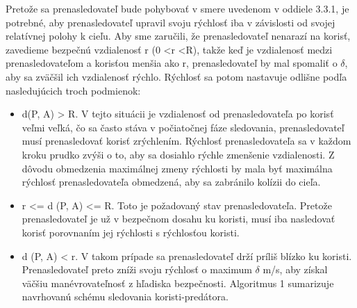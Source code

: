 \vspace{3mm}

\justifying
\noindent
Pretože sa prenasledovateľ bude pohybovať v smere uvedenom v oddiele 3.3.1, je potrebné, aby prenasledovateľ upravil
svoju rýchlosť iba v závislosti od svojej relatívnej polohy k cieľu. Aby sme zaručili, že prenasledovateľ nenarazí na
korisť, zavedieme bezpečnú vzdialenosť r (0 <r <R), takže keď je vzdialenosť medzi prenasledovateľom a korisťou menšia
ako r, prenasledovateľ by mal spomaliť o $\delta$, aby sa zväčšil ich vzdialenosť rýchlo. Rýchlosť sa potom nastavuje
odlišne podľa nasledujúcich troch podmienok: 
\begin{itemize}
    \item d(P, A) > R. V tejto situácii je vzdialenosť od prenasledovateľa po
    korisť veľmi veľká, čo sa často stáva v počiatočnej fáze sledovania, prenasledovateľ musí prenasledovať korisť
    zrýchlením. Rýchlosť prenasledovateľa sa v každom kroku prudko zvýši o to, aby sa dosiahlo rýchle zmenšenie
    vzdialenosti. Z dôvodu obmedzenia maximálnej zmeny rýchlosti by mala byť maximálna rýchlosť prenasledovateľa
    obmedzená, aby sa zabránilo kolízii do cieľa.
    \item r <= d (P, A) <= R. Toto je požadovaný stav prenasledovateľa. Pretože prenasledovateľ je už v bezpečnom dosahu ku
    koristi, musí iba nasledovať korisť porovnaním jej rýchlosti s rýchlosťou koristi.
    \item d (P, A) < r. V takom prípade sa prenasledovateľ drží príliš blízko ku koristi. Prenasledovateľ preto zníži svoju
    rýchlosť o maximum $\delta$ m/s, aby získal väčšiu manévrovateľnosť z hľadiska bezpečnosti. Algoritmus 1 sumarizuje
    navrhovanú schému sledovania koristi-predátora.
\end{itemize} 

\vspace{3mm}

